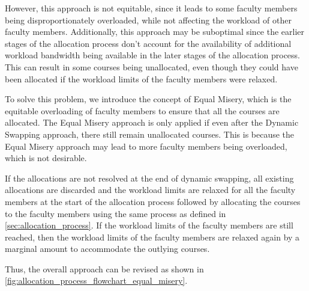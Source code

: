 However, this approach is not equitable, since it leads to some faculty members being disproportionately overloaded, while not affecting the workload of other faculty members. Additionally, this approach may be suboptimal since the earlier stages of the allocation process don't account for the availability of additional workload bandwidth being available in the later stages of the allocation process. This can result in some courses being unallocated, even though they could have been allocated if the workload limits of the faculty members were relaxed.

To solve this problem, we introduce the concept of Equal Misery, which is the equitable overloading of faculty members to ensure that all the courses are allocated. The Equal Misery approach is only applied if even after the Dynamic Swapping approach, there still remain unallocated courses. This is because the Equal Misery approach may lead to more faculty members being overloaded, which is not desirable.

If the allocations are not resolved at the end of dynamic swapping, all existing allocations are discarded and the workload limits are relaxed for all the faculty members at the start of the allocation process followed by allocating the courses to the faculty members using the same process as defined in \autoref{sec:allocation_process}. If the workload limits of the faculty members are still reached, then the workload limits of the faculty members are relaxed again by a marginal amount to accommodate the outlying courses.

Thus, the overall approach can be revised as shown in \autoref{fig:allocation_process_flowchart_equal_misery}.

